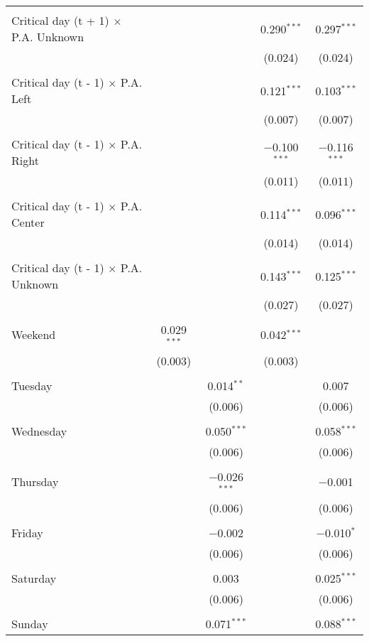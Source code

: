\documentclass[
]{article}
\begin{document}
\begin{table}[!htbp]
{\begin{tabular}{@{\extracolsep{5pt}}lcccc}
  & & & & \\ 
 Critical day (t + 1) $\times$ P.A. Unknown &  &  & 0.290$^{***}$ & 0.297$^{***}$ \\ 
  &  &  & (0.024) & (0.024) \\ 
  & & & & \\ 
 Critical day (t - 1) $\times$ P.A. Left &  &  & 0.121$^{***}$ & 0.103$^{***}$ \\ 
  &  &  & (0.007) & (0.007) \\ 
  & & & & \\ 
 Critical day (t - 1) $\times$ P.A. Right &  &  & $-$0.100$^{***}$ & $-$0.116$^{***}$ \\ 
  &  &  & (0.011) & (0.011) \\ 
  & & & & \\ 
 Critical day (t - 1) $\times$ P.A. Center &  &  & 0.114$^{***}$ & 0.096$^{***}$ \\ 
  &  &  & (0.014) & (0.014) \\ 
  & & & & \\ 
 Critical day (t - 1) $\times$ P.A. Unknown &  &  & 0.143$^{***}$ & 0.125$^{***}$ \\ 
  &  &  & (0.027) & (0.027) \\ 
  & & & & \\ 
 Weekend & 0.029$^{***}$ &  & 0.042$^{***}$ &  \\ 
  & (0.003) &  & (0.003) &  \\ 
  & & & & \\ 
 Tuesday &  & 0.014$^{**}$ &  & 0.007 \\ 
  &  & (0.006) &  & (0.006) \\ 
  & & & & \\ 
 Wednesday &  & 0.050$^{***}$ &  & 0.058$^{***}$ \\ 
  &  & (0.006) &  & (0.006) \\ 
  & & & & \\ 
 Thursday &  & $-$0.026$^{***}$ &  & $-$0.001 \\ 
  &  & (0.006) &  & (0.006) \\ 
  & & & & \\ 
 Friday &  & $-$0.002 &  & $-$0.010$^{*}$ \\ 
  &  & (0.006) &  & (0.006) \\ 
  & & & & \\ 
 Saturday &  & 0.003 &  & 0.025$^{***}$ \\ 
  &  & (0.006) &  & (0.006) \\ 
  & & & & \\ 
 Sunday &  & 0.071$^{***}$ &  & 0.088$^{***}$ \\ 

\end{tabular}}
\end{table}
\end{document}
